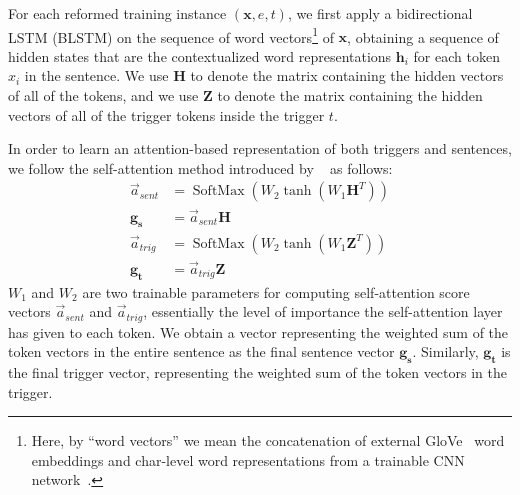 For each reformed training instance $(\mathbf{x}, e, t)$, we first apply a bidirectional LSTM (BLSTM) 
on the sequence of word vectors\footnote{Here, by ``word vectors'' we mean the concatenation of external GloVe~\citep{Pennington2014GloveGV} word embeddings and char-level word representations from a trainable CNN network~\citep{DBLP:conf/acl/MaH16}. } 
of $\mathbf{x}$, obtaining a sequence of hidden states that are the contextualized word representations $\mathbf{h}_i$ for each token $x_i$ in the sentence. 
We use $\mathbf{H}$ to denote the matrix containing the hidden vectors of all of the tokens, and we use $\mathbf{Z}$ to denote the matrix containing the hidden vectors of all of the trigger tokens inside the trigger $t$.

In order to learn an attention-based
representation of both triggers and sentences, we follow the self-attention method introduced by ~\citep{selfattentive} as follows:
{
{ %
		\begin{align*} 
			\vec{a}_{sent}&=\operatorname{SoftMax}\left(W_{2} \tanh \left(W_{1} \mathbf{H}^{T}\right)\right)\\
			\mathbf{g_s}&=\vec{a}_{sent}\mathbf{H}\\
			\vec{a}_{trig}&=\operatorname{SoftMax}\left(W_{2} \tanh \left(W_{1} \mathbf{Z}^{T}\right)\right)\\
			\mathbf{g_t}&=\vec{a}_{trig}\mathbf{Z}
		\end{align*} 
	}
}  
$W_1$ and $W_2$ are two trainable parameters for computing self-attention score vectors $\vec{a}_{sent}$ and $\vec{a}_{trig}$, essentially the level of importance the self-attention layer has given to each token.
We obtain a vector representing the weighted sum of the token vectors in the entire sentence as the final sentence vector $\mathbf{g_s}$. Similarly, $\mathbf{g_t}$ is the final trigger vector, representing the weighted sum of the token vectors in the trigger.

